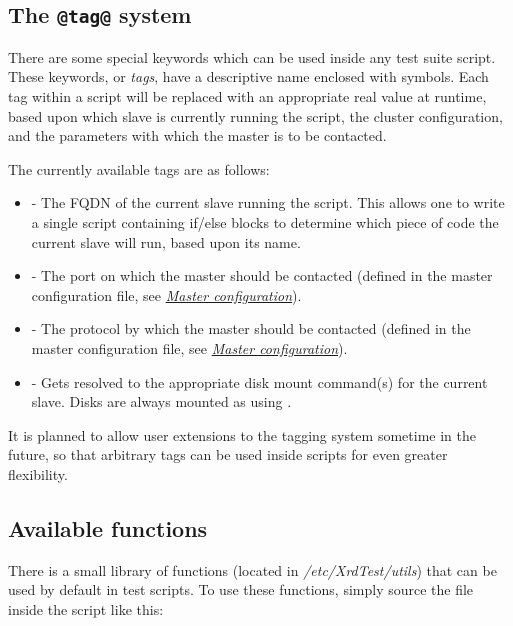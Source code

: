 \documentclass[letterpaper,10pt,english]{sphinxmanual}
\begin{document}
\subsection{The \texttt{@tag@} system}
\label{testsuites:the-tag-system}\label{testsuites:tagging}
There are some special keywords which can be used inside any test suite script.
These keywords, or \emph{tags}, have a descriptive name enclosed with  symbols.
Each tag within a script will be replaced with an appropriate real value at
runtime, based upon which slave is currently running the script, the cluster
configuration, and the parameters with which the master is to be contacted.

The currently available tags are as follows:
\begin{itemize}
\item {} 
 - The FQDN of the current slave running the script. This allows
one to write a single script containing if/else blocks to determine which piece
of code the current slave will run, based upon its name.

\item {} 
 - The port on which the master should be contacted (defined in the
master configuration file, see {\hyperref[config-master::doc]{\emph{Master configuration}}}).

\item {} 
 - The protocol by which the master should be contacted (defined in
the master configuration file, see {\hyperref[config-master::doc]{\emph{Master configuration}}}).

\item {} 
 - Gets resolved to the appropriate disk mount command(s) for
the current slave. Disks are always mounted as  using .

\end{itemize}

It is planned to allow user extensions to the tagging system sometime in the
future, so that arbitrary tags can be used inside scripts for even greater
flexibility.


\subsection{Available functions}
\label{testsuites:functions}\label{testsuites:available-functions}
There is a small library of functions (located in \emph{/etc/XrdTest/utils}) that can
be used by default in test scripts. To use these functions, simply source the
file inside the script like this:
\end{document}
